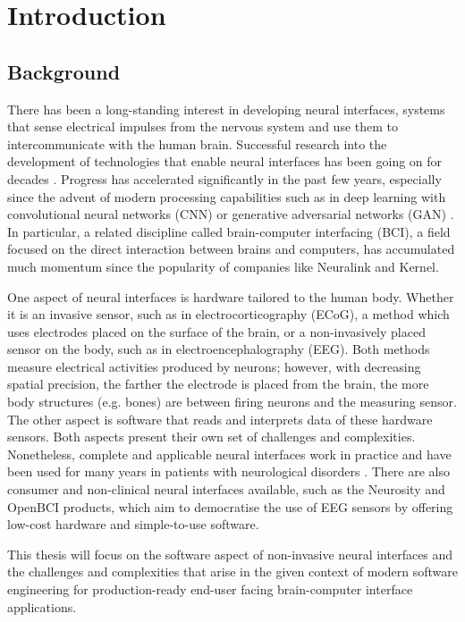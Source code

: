 \chapter{Introduction}
\graphicspath{{Chapter1/Figs/}{Chapter1/Figs/}}

\section{Background}
\label{chapter1-background}

There has been a long-standing interest in developing neural interfaces, systems that sense electrical impulses from the nervous system and use them to intercommunicate with the human brain. Successful research into the development of technologies that enable neural interfaces has been going on for decades \citep{vidal_real-time_1977}. Progress has accelerated significantly in the past few years, especially since the advent of modern processing capabilities such as in deep learning with convolutional neural networks (CNN) or generative adversarial networks (GAN) \citep{gonfalonieri_deep_2019}. In particular, a related discipline called brain-computer interfacing (BCI), a field focused on the direct interaction between brains and computers, has accumulated much momentum since the popularity of companies like Neuralink and Kernel.

One aspect of neural interfaces is hardware tailored to the human body. Whether it is an invasive sensor, such as in electrocorticography (ECoG), a method which uses electrodes placed on the surface of the brain, or a non-invasively placed sensor on the body, such as in electroencephalography (EEG). Both methods measure electrical activities produced by neurons; however, with decreasing spatial precision, the farther the electrode is placed from the brain, the more body structures (e.g. bones) are between firing neurons and the measuring sensor. The other aspect is software that reads and interprets data of these hardware sensors. Both aspects present their own set of challenges and complexities. Nonetheless, complete and applicable neural interfaces work in practice and have been used for many years in patients with neurological disorders \citep{braingate_publications_nodate}. There are also consumer and non-clinical neural interfaces available, such as the Neurosity and OpenBCI products, which aim to democratise the use of EEG sensors by offering low-cost hardware and simple-to-use software.

This thesis will focus on the software aspect of non-invasive neural interfaces and the challenges and complexities that arise in the given context of modern software engineering for production-ready end-user facing brain-computer interface applications.

